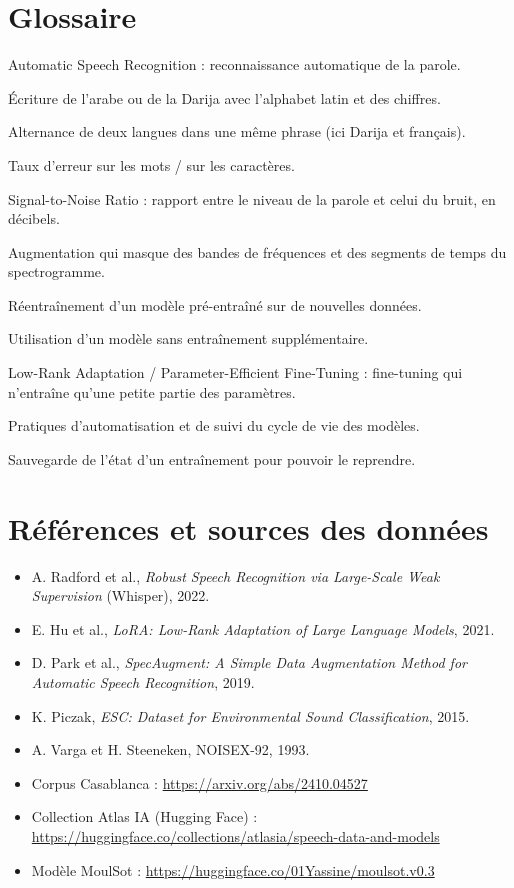 \documentclass[12pt,a4paper]{report}
\begin{document}
\section{Glossaire}
\begin{description}[style=nextline]
  \item[ASR] Automatic Speech Recognition : reconnaissance automatique de la parole.
  \item[Arabizi] Écriture de l'arabe ou de la Darija avec l'alphabet latin et des
        chiffres.
  \item[Code-switching] Alternance de deux langues dans une même phrase
        (ici Darija et français).
  \item[WER / CER] Taux d'erreur sur les mots / sur les caractères.
  \item[SNR] Signal-to-Noise Ratio : rapport entre le niveau de la parole et celui
        du bruit, en décibels.
  \item[SpecAugment] Augmentation qui masque des bandes de fréquences et des
        segments de temps du spectrogramme.
  \item[Fine-tuning] Réentraînement d'un modèle pré-entraîné sur de nouvelles
        données.
  \item[Zero-shot] Utilisation d'un modèle sans entraînement supplémentaire.
  \item[LoRA / PEFT] Low-Rank Adaptation / Parameter-Efficient Fine-Tuning :
        fine-tuning qui n'entraîne qu'une petite partie des paramètres.
  \item[MLOps] Pratiques d'automatisation et de suivi du cycle de vie des modèles.
  \item[Checkpoint] Sauvegarde de l'état d'un entraînement pour pouvoir le reprendre.
\end{description}

\section{Références et sources des données}
\begin{itemize}
  \item A. Radford et al., \emph{Robust Speech Recognition via Large-Scale Weak
        Supervision} (Whisper), 2022.
  \item E. Hu et al., \emph{LoRA: Low-Rank Adaptation of Large Language Models},
        2021.
  \item D. Park et al., \emph{SpecAugment: A Simple Data Augmentation Method for
        Automatic Speech Recognition}, 2019.
  \item K. Piczak, \emph{ESC: Dataset for Environmental Sound Classification}, 2015.
  \item A. Varga et H. Steeneken, NOISEX-92, 1993.
  \item Corpus Casablanca : \url{https://arxiv.org/abs/2410.04527}
  \item Collection Atlas IA (Hugging Face) :
        \url{https://huggingface.co/collections/atlasia/speech-data-and-models}
  \item Modèle MoulSot : \url{https://huggingface.co/01Yassine/moulsot.v0.3}
\end{itemize}
\end{document}
